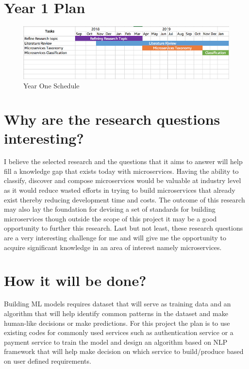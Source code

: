 \documentclass{article}
\begin{document}
\section{Year 1 Plan}


\begin{figure}[h]
\includegraphics{projectplan.png}
\caption{Year One Schedule}
\end{figure}

\section{Why are the research questions interesting?}


I believe the selected research and the questions that it aims to answer will help fill a knowledge gap that exists today with microservices. Having the ability to classify, discover and compose microservices would be valuable at industry level as it would reduce wasted efforts in trying to build microservices that already exist thereby reducing development time and costs. The outcome of this research may also lay the foundation for devising a set of standards for building microservices though outside the scope of this project it may be a good opportunity to further this research. Last but not least, these research questions are a very interesting challenge for me and will give me the opportunity to acquire significant knowledge in an area of interest namely microservices.


\section{How it will be done?}

Building ML models requires dataset that will serve as training data and an algorithm that will help identify common patterns in the dataset and make human-like decisions or make predictions. For this project the plan is to use existing codes for commonly used services such as authentication service or a payment service to train the model and design an algorithm based on NLP framework that will help make decision on which service to build/produce based on user defined requirements.
\end{document}
